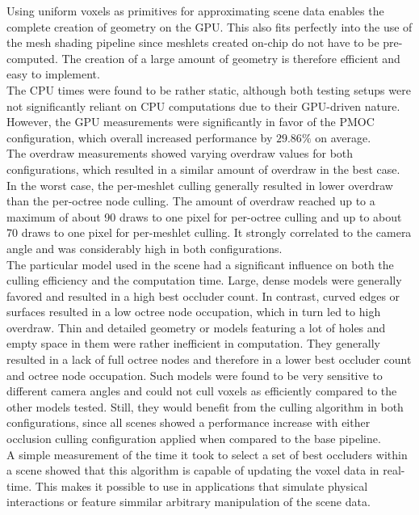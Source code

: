 \noindent
Using uniform voxels as primitives for approximating scene data enables the complete creation of geometry on the 
\ac{GPU}. This also fits perfectly into the use of the mesh shading pipeline since meshlets created on-chip do 
not have to be pre-computed. The creation of a large amount of geometry is therefore efficient and easy to 
implement. \\

\noindent
The \ac{CPU} times were found to be rather static, although both testing setups were not significantly reliant 
on \ac{CPU} computations due to their \ac{GPU}-driven nature. However, the \ac{GPU} measurements were significantly 
in favor of the \ac{PMOC} configuration, which overall increased performance by $29.86\%$ on average. \\

\noindent
The overdraw measurements showed varying overdraw values for both configurations, which resulted in a similar amount 
of overdraw in the best case. In the worst case, the per-meshlet culling generally resulted in lower overdraw than 
the per-octree node culling. The amount of overdraw reached up to a maximum of about 90 draws to one pixel for 
per-octree culling and up to about 70 draws to one pixel for per-meshlet culling. It strongly correlated to the 
camera angle and was considerably high in both configurations. \\ 

\noindent
The particular model used in the scene had a significant influence on both the culling efficiency and the computation 
time. Large, dense models were generally favored and resulted in a high best occluder count. In contrast, curved edges 
or surfaces resulted in a low octree node occupation, which in turn led to high overdraw. Thin and detailed geometry 
or models featuring a lot of holes and empty space in them were rather inefficient in computation. They generally 
resulted in a lack of full octree nodes and therefore in a lower best occluder count and octree node occupation. Such 
models were found to be very sensitive to different camera angles and could not cull voxels as efficiently compared 
to the other models tested. Still, they would benefit from the culling algorithm in both configurations, since all 
scenes showed a performance increase with either occlusion culling configuration applied when compared to the base 
pipeline. \\

\noindent
A simple measurement of the time it took to select a set of best occluders within a scene showed that this algorithm 
is capable of updating the voxel data in real-time. This makes it possible to use in applications that simulate physical 
interactions or feature simmilar arbitrary manipulation of the scene data.

